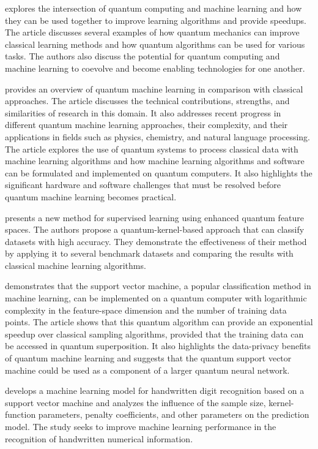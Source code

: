  explores the intersection of quantum computing and machine learning and how they can be used together to improve learning algorithms and provide speedups. The article discusses several examples of how quantum mechanics can improve classical learning methods and how quantum algorithms can be used for various tasks. The authors also discuss the potential for quantum computing and machine learning to coevolve and become enabling technologies for one another.

 provides an overview of quantum machine learning in comparison with classical approaches. The article discusses the technical contributions, strengths, and similarities of research in this domain. It also addresses recent progress in different quantum machine learning approaches, their complexity, and their applications in fields such as physics, chemistry, and natural language processing. The article explores the use of quantum systems to process classical data with machine learning algorithms and how machine learning algorithms and software can be formulated and implemented on quantum computers. It also highlights the significant hardware and software challenges that must be resolved before quantum machine learning becomes practical.

 presents a new method for supervised learning using enhanced quantum feature spaces. The authors propose a quantum-kernel-based approach that can classify datasets with high accuracy. They demonstrate the effectiveness of their method by applying it to several benchmark datasets and comparing the results with classical machine learning algorithms.

 demonstrates that the support vector machine, a popular classification method in machine learning, can be implemented on a quantum computer with logarithmic complexity in the feature-space dimension and the number of training data points. The article shows that this quantum algorithm can provide an exponential speedup over classical sampling algorithms, provided that the training data can be accessed in quantum superposition. It also highlights the data-privacy benefits of quantum machine learning and suggests that the quantum support vector machine could be used as a component of a larger quantum neural network.

 develops a machine learning model for handwritten digit recognition based on a support vector machine and analyzes the influence of the sample size, kernel-function parameters, penalty coefficients, and other parameters on the prediction model. The study seeks to improve machine learning performance in the recognition of handwritten numerical information.

